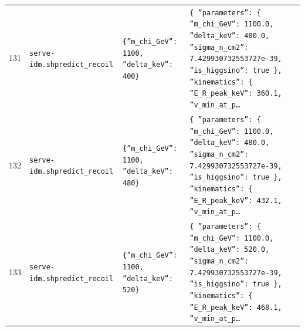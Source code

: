 \documentclass[11pt,a4paper]{article}
\begin{document}
\begin{longtable}{@{}p{}p{}p{}p{}@{}}
131 & \texttt{serve-idm.sh}\newline\texttt{predict\_\allowbreak{}recoil} & \texttt{\{''m\_\allowbreak{}chi\_\allowbreak{}GeV'':\allowbreak{} 1100,\allowbreak{} ''delta\_\allowbreak{}keV'':\allowbreak{} 400\}\allowbreak{}} & \texttt{\{   ''parameters'':\allowbreak{} \{     ''m\_\allowbreak{}chi\_\allowbreak{}GeV'':\allowbreak{} 1100.0,\allowbreak{}     ''delta\_\allowbreak{}keV'':\allowbreak{} 400.0,\allowbreak{}     ''sigma\_\allowbreak{}n\_\allowbreak{}cm2'':\allowbreak{} 7.429930732553727e-39,\allowbreak{}     ''is\_\allowbreak{}higgsino'':\allowbreak{} true   \}\allowbreak{},\allowbreak{}   ''kinematics'':\allowbreak{} \{     ''E\_\allowbreak{}R\_\allowbreak{}peak\_\allowbreak{}keV'':\allowbreak{} 360.1,\allowbreak{}     ''v\_\allowbreak{}min\_\allowbreak{}at\_\allowbreak{}p\ldots{}\allowbreak{}} \\
132 & \texttt{serve-idm.sh}\newline\texttt{predict\_\allowbreak{}recoil} & \texttt{\{''m\_\allowbreak{}chi\_\allowbreak{}GeV'':\allowbreak{} 1100,\allowbreak{} ''delta\_\allowbreak{}keV'':\allowbreak{} 480\}\allowbreak{}} & \texttt{\{   ''parameters'':\allowbreak{} \{     ''m\_\allowbreak{}chi\_\allowbreak{}GeV'':\allowbreak{} 1100.0,\allowbreak{}     ''delta\_\allowbreak{}keV'':\allowbreak{} 480.0,\allowbreak{}     ''sigma\_\allowbreak{}n\_\allowbreak{}cm2'':\allowbreak{} 7.429930732553727e-39,\allowbreak{}     ''is\_\allowbreak{}higgsino'':\allowbreak{} true   \}\allowbreak{},\allowbreak{}   ''kinematics'':\allowbreak{} \{     ''E\_\allowbreak{}R\_\allowbreak{}peak\_\allowbreak{}keV'':\allowbreak{} 432.1,\allowbreak{}     ''v\_\allowbreak{}min\_\allowbreak{}at\_\allowbreak{}p\ldots{}\allowbreak{}} \\
133 & \texttt{serve-idm.sh}\newline\texttt{predict\_\allowbreak{}recoil} & \texttt{\{''m\_\allowbreak{}chi\_\allowbreak{}GeV'':\allowbreak{} 1100,\allowbreak{} ''delta\_\allowbreak{}keV'':\allowbreak{} 520\}\allowbreak{}} & \texttt{\{   ''parameters'':\allowbreak{} \{     ''m\_\allowbreak{}chi\_\allowbreak{}GeV'':\allowbreak{} 1100.0,\allowbreak{}     ''delta\_\allowbreak{}keV'':\allowbreak{} 520.0,\allowbreak{}     ''sigma\_\allowbreak{}n\_\allowbreak{}cm2'':\allowbreak{} 7.429930732553727e-39,\allowbreak{}     ''is\_\allowbreak{}higgsino'':\allowbreak{} true   \}\allowbreak{},\allowbreak{}   ''kinematics'':\allowbreak{} \{     ''E\_\allowbreak{}R\_\allowbreak{}peak\_\allowbreak{}keV'':\allowbreak{} 468.1,\allowbreak{}     ''v\_\allowbreak{}min\_\allowbreak{}at\_\allowbreak{}p\ldots{}\allowbreak{}} \\

\end{longtable}
\end{document}
